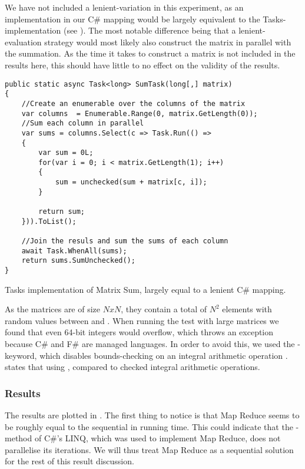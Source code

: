 We have not included a lenient-variation in this experiment, as an implementation in our C\# mapping would be largely equivalent to the Tasks-implementation (see ). The most notable difference being that a lenient-evaluation strategy would most likely also construct the matrix in parallel with the summation. As the time it takes to construct a matrix is not included in the results here, this should have little to no effect on the validity of the results.
\begin{listing}
\begin{verbatim}
public static async Task<long> SumTask(long[,] matrix)
{
    //Create an enumerable over the columns of the matrix
    var columns  = Enumerable.Range(0, matrix.GetLength(0));
    //Sum each column in parallel
    var sums = columns.Select(c => Task.Run(() =>
    {
        var sum = 0L;
        for(var i = 0; i < matrix.GetLength(1); i++)
        {
            sum = unchecked(sum + matrix[c, i]);
        }

        return sum;
    })).ToList();

    //Join the resuls and sum the sums of each column
    await Task.WhenAll(sums);
    return sums.SumUnchecked();
}
\end{verbatim}
\caption{Tasks implementation of Matrix Sum, largely equal to a lenient C\# mapping.} \label{lst:matrix-sum-csharp}
\end{listing}

As the matrices are of size $N x N$, they contain a total of $N^2$ elements with random values between  and . When running the test with large matrices we found that even 64-bit integers would overflow, which throws an exception because C\# and F\# are managed languages. In order to avoid this, we used the -keyword, which disables bounds-checking on an integral arithmetic operation \cite{csharp:unchecked}. \cite{csharp:unchecked} states that using  \textit{}, compared to checked integral arithmetic operations.

\subsubsection{Results}
The results are plotted in . The first thing to notice is that Map Reduce seems to be roughly equal to the sequential in running time. This could indicate that the -method of C\#'s \gls{LINQ}, which was used to implement Map Reduce, does not parallelise its iterations. We will thus treat Map Reduce as a sequential solution for the rest of this result discussion. 


